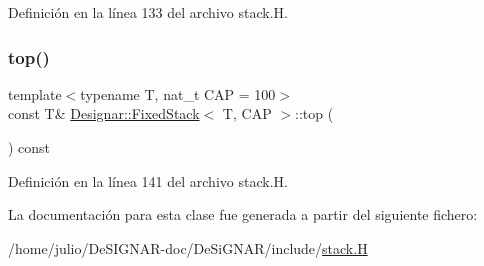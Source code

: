 Definición en la línea 133 del archivo stack.\+H.

\mbox{\label{class_designar_1_1_fixed_stack_a02582f09d4935d315b28da7ae93db0b3}} 
\subsubsection{\texorpdfstring{top()}{top()}\hspace{0.1cm}{\footnotesize\ttfamily [2/2]}}
{\footnotesize\ttfamily template$<$typename T, nat\+\_\+t C\+AP = 100$>$ \\
const T\& \hyperlink{class_designar_1_1_fixed_stack}{Designar\+::\+Fixed\+Stack}$<$ T, C\+AP $>$\+::top (\begin{DoxyParamCaption}{ }\end{DoxyParamCaption}) const\hspace{0.3cm}{\ttfamily [inline]}}



Definición en la línea 141 del archivo stack.\+H.



La documentación para esta clase fue generada a partir del siguiente fichero\+:\begin{DoxyCompactItemize}
\item 
/home/julio/\+De\+S\+I\+G\+N\+A\+R-\/doc/\+De\+Si\+G\+N\+A\+R/include/\hyperlink{stack_8_h}{stack.\+H}\end{DoxyCompactItemize}
